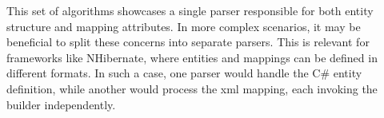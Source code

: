 This set of algorithms showcases a single parser responsible for both entity structure and mapping attributes. In more complex scenarios, it may be beneficial to split these concerns into separate parsers. This is relevant for frameworks like NHibernate, where entities and mappings can be defined in different formats. In such a case, one parser would handle the C\# entity definition, while another would process the \acrshort{xml} mapping, each invoking the builder independently. 

